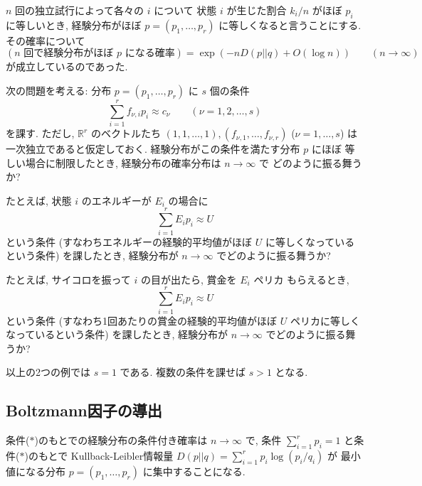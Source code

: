 \documentclass[12pt,twoside]{jarticle}
\newcommand\R{{\mathbb R}} %
\theoremstyle{jplain}
\theoremstyle{jplain}
\theoremstyle{jplain}
\numberwithin{theorem}{section}
\numberwithin{equation}{section}
\numberwithin{figure}{section}
\numberwithin{table}{section}
\begin{document}
$n$ 回の独立試行によって各々の $i$ について
状態 $i$ が生じた割合 $k_i/n$ がほぼ $p_i$ に等しいとき,
経験分布がほぼ $p=(p_1,\ldots,p_r)$ に等しくなると言うことにする.
その確率について
\[
(\text{$n$ 回で経験分布がほぼ $p$ になる確率})
=
\exp(-n D(p||q) + O(\log n))
\qquad (n\to\infty)
\]
が成立しているのであった.

次の問題を考える: 分布 $p=(p_1,\ldots,p_r)$ に $s$ 個の条件
\[
\sum_{i=1}^r f_{\nu,i}p_i \approx c_\nu
\qquad (\nu=1,2,\ldots,s)
\tag{$*$}
\]
を課す.
ただし, $\R^r$ のベクトルたち $(1,1,\ldots,1),(f_{\nu,1},\ldots,f_{\nu,r})$
($\nu=1,\ldots,s$) は一次独立であると仮定しておく.
経験分布がこの条件を満たす分布 $p$ にほぼ
等しい場合に制限したとき, 経験分布の確率分布は $n\to\infty$ で
どのように振る舞うか?

たとえば, 状態 $i$ のエネルギーが $E_i$ の場合に
\[
\sum_{i=1}^r E_i p_i \approx U
\]
という条件
(すなわちエネルギーの経験的平均値がほぼ $U$ に等しくなっているという条件)
を課したとき, 経験分布が $n\to\infty$ でどのように振る舞うか?

たとえば, サイコロを振って $i$ の目が出たら, 賞金を $E_i$ ペリカ
もらえるとき,
\[
\sum_{i=1}^r E_i p_i \approx U
\]
という条件
(すなわち1回あたりの賞金の経験的平均値がほぼ $U$ ペリカに等しくなっているという条件)
を課したとき, 経験分布が $n\to\infty$ でどのように振る舞うか?

以上の2つの例では $s=1$ である.  複数の条件を課せば $s>1$ となる.


\subsection{Boltzmann因子の導出}

条件($*$)のもとでの経験分布の条件付き確率は $n\to\infty$ で,
条件 $\sum_{i=1}^r p_i=1$ と条件($*$)のもとで
Kullback-Leibler情報量 $D(p||q)=\sum_{i=1}^r p_i\log(p_i/q_i)$ が
最小値になる分布 $p=(p_1,\ldots,p_r)$ に集中することになる.
\end{document}
